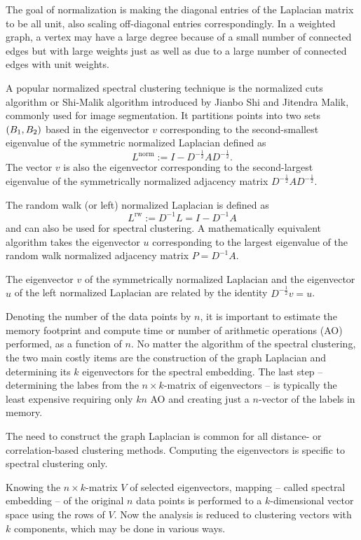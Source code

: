 The goal of normalization is making the diagonal entries of the Laplacian matrix to be all unit, also scaling off-diagonal entries correspondingly.
In a weighted graph, a vertex may have a large degree because of a small number of connected edges but with large weights just as well as due to a large number of connected edges with unit weights.

A popular normalized spectral clustering technique is the normalized cuts algorithm or Shi-Malik algorithm introduced by Jianbo Shi and Jitendra Malik, commonly used for image segmentation.
It partitions points into two sets \(\parentheses*{B_1, B_2}\) based in the eigenvector \(v\) corresponding to the second-smallest eigenvalue of the symmetric normalized Laplacian defined as
\[
	L^{\text{norm}} := I - D^{-\frac{1}{2}}AD^{-\frac{1}{2}}.
\]
The vector \(v\) is also the eigenvector corresponding to the second-largest eigenvalue of the symmetrically normalized adjacency matrix \(D^{-\frac{1}{2}}AD^{-\frac{1}{2}}\).

The random walk (or left) normalized Laplacian is defined as
\[
	L^{\text{rw}} := D^{-1}L = I - D^{-1} A
\]
and can also be used for spectral clustering.
A mathematically equivalent algorithm takes the eigenvector \(u\) corresponding to the largest eigenvalue of the random walk normalized adjacency matrix \(P = D^{-1}A\).

The eigenvector \(v\) of the symmetrically normalized Laplacian and the eigenvector \(u\) of the left normalized Laplacian are related by the identity \(D^{-\frac{1}{2}}v = u\).

Denoting the number of the data points by \(n\), it is important to estimate the memory footprint and compute time or number of arithmetic operations (AO) performed, as a function of \(n\).
No matter the algorithm of the spectral clustering, the two main costly items are the construction of the graph Laplacian and determining its \(k\) eigenvectors for the spectral embedding.
The last step -- determining the labes from the \(n \times k\)-matrix of eigenvectors -- is typically the least expensive requiring only \(kn\) AO and creating just a \(n\)-vector of the labels in memory.

The need to construct the graph Laplacian is common for all distance- or correlation-based clustering methods.
Computing the eigenvectors is specific to spectral clustering only.

Knowing the \(n \times k\)-matrix \(V\) of selected eigenvectors, mapping -- called spectral embedding -- of the original \(n\) data points is performed to a \(k\)-dimensional vector space using the rows of \(V\).
Now the analysis is reduced to clustering vectors with \(k\) components, which may be done in various ways.

